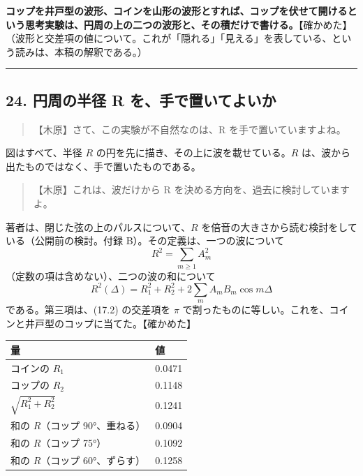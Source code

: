 \documentclass[
  a4paper,
]{ltjsarticle}
\newcounter{none} %
\begin{document}
\textbf{コップを井戸型の波形、コインを山形の波形とすれば、コップを伏せて開けるという思考実験は、円周の上の二つの波形と、その積だけで書ける。}【確かめた】（波形と交差項の値について。これが「隠れる」「見える」を表している、という読みは、本稿の解釈である。）

\begin{center}\rule{0.5\linewidth}{0.5pt}\end{center}

\subsection{24. 円周の半径 R
を、手で置いてよいか}\label{ux5186ux5468ux306eux534aux5f84-r-ux3092ux624bux3067ux7f6eux3044ux3066ux3088ux3044ux304b}

\begin{quote}
【木原】さて、この実験が不自然なのは、R を手で置いていますよね。
\end{quote}

図はすべて、半径 \(R\) の円を先に描き、その上に波を載せている。\(R\)
は、波から出たものではなく、手で置いたものである。

\begin{quote}
【木原】これは、波だけから R を決める方向を、過去に検討していますよ。
\end{quote}

著者は、閉じた弦の上のパルスについて、\(R\)
を倍音の大きさから読む検討をしている（公開前の検討。付録
B）。その定義は、一つの波について \[
R^2 = \sum_{m\ge1} A_m^2 \tag{24.1}
\] （定数の項は含めない）、二つの波の和について \[
R^2(\Delta) = R_1^2 + R_2^2 + 2\sum_m A_m B_m\cos m\Delta \tag{24.2}
\] である。第三項は、(17.2) の交差項を \(\pi\)
で割ったものに等しい。これを、コインと井戸型のコップに当てた。【確かめた】

{\def\LTcaptype{none} %
\begin{longtable}[]{@{}ll@{}}
\toprule\noalign{}
量 & 値 \\
\midrule\noalign{}
\endhead
\bottomrule\noalign{}
\endlastfoot
コインの \(R_1\) & 0.0471 \\
コップの \(R_2\) & 0.1148 \\
\(\sqrt{R_1^2+R_2^2}\) & 0.1241 \\
和の \(R\)（コップ 90°、重ねる） & 0.0904 \\
和の \(R\)（コップ 75°） & 0.1092 \\
和の \(R\)（コップ 60°、ずらす） & 0.1258 \\
\end{longtable}
}
\end{document}
